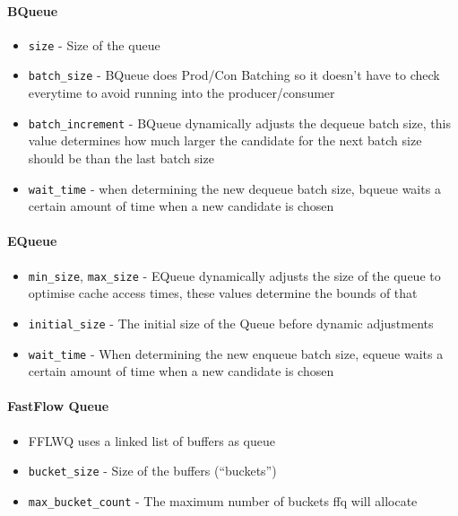 \paragraph{BQueue}
\begin{itemize}
    \item \texttt{size} - Size of the queue
    \item \texttt{batch\_size} - BQueue does Prod/Con Batching so it doesn't have to check everytime to avoid
        running into the producer/consumer
    \item \texttt{batch\_increment} - BQueue dynamically adjusts the dequeue batch size, this value
        determines how much larger the candidate for the next batch size should be than the last batch size
    \item \texttt{wait\_time} - when determining the new dequeue batch size, bqueue waits a certain amount of
        time when a new candidate is chosen
\end{itemize}

\paragraph{EQueue}
\begin{itemize}
    \item \texttt{min\_size}, \texttt{max\_size} - EQueue dynamically adjusts the size of the queue to
        optimise cache access times, these values determine the bounds of that
    \item \texttt{initial\_size} - The initial size of the Queue before dynamic adjustments
    \item \texttt{wait\_time} - When determining the new enqueue batch size, equeue waits a certain amount of
        time when a new candidate is chosen
\end{itemize}

\paragraph{FastFlow Queue}
\begin{itemize}
    \item FFLWQ uses a linked list of buffers as queue 
    \item \texttt{bucket\_size} - Size of the buffers (``buckets'')
    \item \texttt{max\_bucket\_count} - The maximum number of buckets ffq will allocate
\end{itemize}

